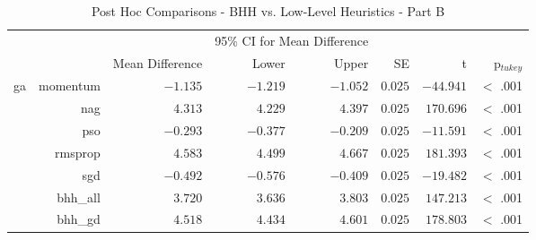 \begin{table}[H]
	\centering
	\caption{Post Hoc Comparisons - BHH vs. Low-Level Heuristics - Part B}
	\label{tab:results:standalone:post_hoc}%
	\par\bigskip
	\resizebox{\textwidth}{!}
	{
		\begin{tabular}{lrrrrrrr}
			\toprule
			\multicolumn{1}{c}{} & \multicolumn{1}{c}{} & \multicolumn{1}{c}{} & \multicolumn{2}{c}{95\% CI for Mean Difference} & \multicolumn{1}{c}{} & \multicolumn{1}{c}{} & \multicolumn{1}{c}{}               \\
			\cline{4-5}
			$ $                  & $ $                  & Mean Difference      & Lower                                           & Upper                & SE                   & t                    & p$_{tukey}$ \\
			\cmidrule[0.4pt]{1-8}
			ga                   & momentum             & $-1.135$             & $-1.219$                                        & $-1.052$             & $0.025$              & $-44.941$            & $<$ .001    \\
			$ $                  & nag                  & $4.313$              & $4.229$                                         & $4.397$              & $0.025$              & $170.696$            & $<$ .001    \\
			                     & pso                  & $-0.293$             & $-0.377$                                        & $-0.209$             & $0.025$              & $-11.591$            & $<$ .001    \\
			                     & rmsprop              & $4.583$              & $4.499$                                         & $4.667$              & $0.025$              & $181.393$            & $<$ .001    \\
			                     & sgd                  & $-0.492$             & $-0.576$                                        & $-0.409$             & $0.025$              & $-19.482$            & $<$ .001    \\
			                     & bhh\_all             & $3.720$              & $3.636$                                         & $3.803$              & $0.025$              & $147.213$            & $<$ .001    \\
			                     & bhh\_gd              & $4.518$              & $4.434$                                         & $4.601$              & $0.025$              & $178.803$            & $<$ .001    \\

\end{tabular}}
\end{table}
